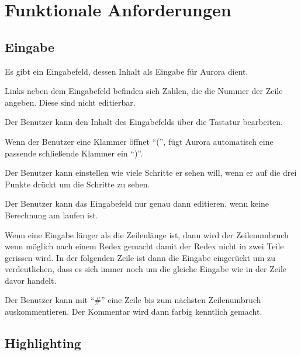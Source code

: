 \documentclass[parskip=full,11pt,twoside]{scrartcl}
\begin{document}
\section{Funktionale Anforderungen}

\subsection{Eingabe}

Es gibt ein Eingabefeld, dessen Inhalt als Eingabe für Aurora dient.

Links neben dem Eingabefeld befinden sich Zahlen, die die Nummer der Zeile angeben. Diese sind nicht editierbar.

Der Benutzer kann den Inhalt des Eingabefelds über die Tastatur bearbeiten.

Wenn der Benutzer eine Klammer öffnet \enquote{(}, fügt Aurora automatisch eine passende schließende Klammer ein \enquote{)}.

Der Benutzer kann einstellen wie viele Schritte er sehen will, wenn er auf die drei Punkte drückt um die Schritte zu sehen.

Der Benutzer kann das Eingabefeld nur genau dann editieren, wenn keine Berechnung am laufen ist.

Wenn eine Eingabe länger als die Zeilenlänge ist, dann wird der Zeilenumbruch wenn möglich nach einem Redex gemacht damit der Redex nicht in zwei Teile gerissen wird. In der folgenden Zeile ist dann
die Eingabe eingerückt um zu verdeutlichen, dass es sich immer noch um die gleiche Eingabe wie in der Zeile davor handelt.

Der Benutzer kann mit \enquote{\#} eine Zeile bis zum nächsten Zeilenumbruch auskommentieren.
Der Kommentar wird dann farbig kenntlich gemacht.

\subsection{Highlighting}
\end{document}
